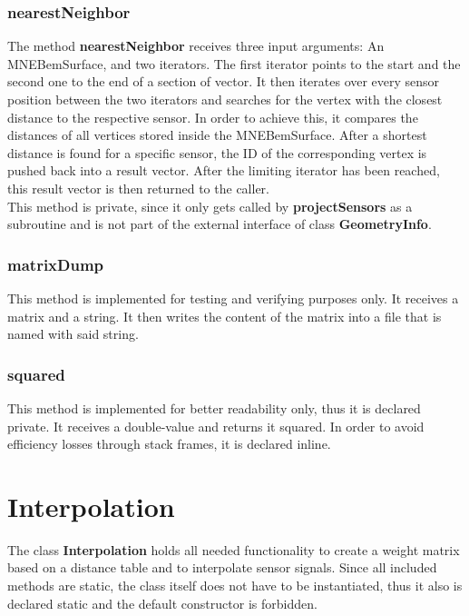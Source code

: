\clearpage

\subsubsection{nearestNeighbor}
The method \textbf{nearestNeighbor} receives three input arguments: An MNEBemSurface, and two iterators. The first iterator points to the start and the second one to the end of a section of vector.
It then iterates over every sensor position between the two iterators and searches for the vertex with the closest distance to the respective sensor. In order to achieve this, it compares the distances of all vertices stored inside the MNEBemSurface. After a shortest distance is found for a specific sensor, the ID of the corresponding vertex is pushed back into a result vector. After the limiting iterator has been reached, this result vector is then returned to the caller.\\
This method is private, since it only gets called by \textbf{projectSensors} as a subroutine and is not part of the external interface of class \textbf{GeometryInfo}.

\subsubsection{matrixDump}
This method is implemented for testing and verifying purposes only. It receives a matrix and a string. It then writes the content of the matrix into a file that is named with said string.

\subsubsection{squared}
This method is implemented for better readability only, thus it is declared private. It receives a double-value and returns it squared. In order to avoid efficiency losses through stack frames, it is declared inline.

\clearpage


\section{Interpolation}
The class \textbf{Interpolation} holds all needed functionality to create a weight matrix based on a distance table and to interpolate sensor signals. Since all included methods are static, the class itself does not have to be instantiated, thus it also is declared static and the default constructor is forbidden.

